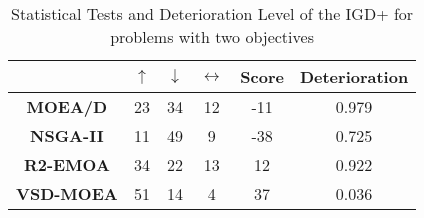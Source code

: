 \begin{table}[t]
\caption{Statistical Tests and Deterioration Level of the IGD+ for problems with two objectives}
\label{tab:Tests_IGDP_2obj}
\centering
\begin{scriptsize}
\begin{tabular}{c c|c|c|c|c}
\cline{2-6}
                                        & \textbf{$\uparrow$} & \textbf{$\downarrow$} & \textbf{$\leftrightarrow$} & \textbf{Score}& \textbf{Deterioration} \\ \hline
\multicolumn{1}{c|}{\textbf{MOEA/D}}   & 23                  & 34                     & 12                         & -11                         & 0.979         \\ \hline
\multicolumn{1}{c|}{\textbf{NSGA-II}}  & 11                  & 49                     & 9                          & -38                          & 0.725         \\ \hline
\multicolumn{1}{c|}{\textbf{R2-EMOA}}  & 34                  & 22                     & 13                         & 12                         & 0.922         \\ \hline
\multicolumn{1}{c|}{\textbf{VSD-MOEA}} & 51                  & 14                     & 4                          & 37                          & 0.036         \\ \hline
\end{tabular}%
\end{scriptsize}
\end{table}

